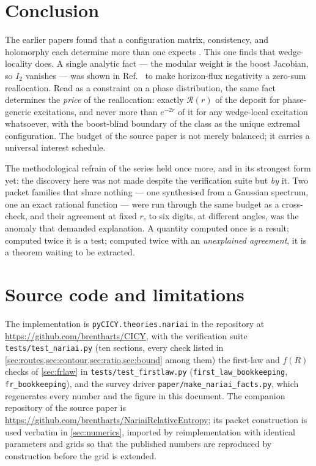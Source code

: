 \documentclass[11pt,a4paper]{article}
\theoremstyle{plain}
\theoremstyle{definition}
\begin{document}

\section{Conclusion}
\label{sec:conclusion}

The earlier papers found that a configuration matrix, consistency, and
holomorphy each determine more than one expects
\cite{SuppMath,SuppStrings,SuppTwistor}. This one finds that wedge-locality
does. A single analytic fact --- the modular weight is the boost Jacobian,
so $I_2$ vanishes --- was shown in Ref.~\cite{NariaiI} to make horizon-flux
negativity a zero-sum reallocation. Read as a constraint on a phase
distribution, the same fact determines the \emph{price} of the
reallocation: exactly $\mathcal{R}(r)$ of the deposit for phase-generic
excitations, and never more than $e^{-2r}$ of it for any wedge-local
excitation whatsoever, with the boost-blind boundary of the class as the
unique extremal configuration. The budget of the source paper is not merely
balanced; it carries a universal interest schedule.

The methodological refrain of the series held once more, and in its
strongest form yet: the discovery here was not made despite the verification
suite but \emph{by} it. Two packet families that share nothing --- one
synthesised from a Gaussian spectrum, one an exact rational function ---
were run through the same budget as a cross-check, and their agreement at
fixed $r$, to six digits, at different angles, was the anomaly that demanded
explanation. A quantity computed once is a result; computed twice it is a
test; computed twice with an \emph{unexplained agreement}, it is a theorem
waiting to be extracted.


\section{Source code and limitations}
\label{sec:source}

The implementation is \texttt{pyCICY.theories.nariai} in the repository at
\url{https://github.com/brentharts/CICY}, with the verification suite
\texttt{tests/test\_nariai.py} (ten sections, every check listed in
\cref{sec:routes,sec:contour,sec:ratio,sec:bound} among them) the first-law and
$f(R)$ checks of \cref{sec:frlaw} in \texttt{tests/test\_firstlaw.py}
(\texttt{first\_law\_bookkeeping}, \texttt{fr\_bookkeeping}), and the survey
driver \texttt{paper/make\_nariai\_facts.py}, which regenerates every number
and the figure in this document. The companion repository of the source
paper \cite{NariaiI} is \url{https://github.com/brentharts/NariaiRelativeEntropy}; 
its packet construction is used verbatim in \cref{sec:numerics}, imported by
reimplementation with identical parameters and grids so that the published
numbers are reproduced by construction before the grid is extended.
\end{document}
